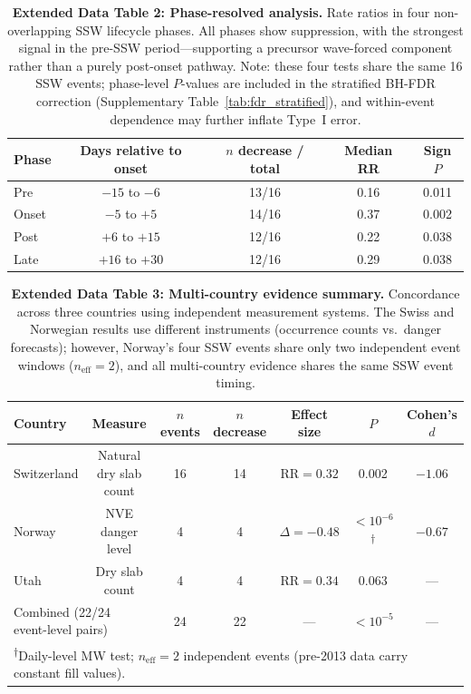 \documentclass[11pt,letterpaper]{article}
\begin{document}
\begin{table}[!ht]
\centering
\caption{\textbf{Extended Data Table 2: Phase-resolved analysis.}
Rate ratios in four non-overlapping SSW lifecycle phases. All phases show suppression, with the strongest signal in the pre-SSW period---supporting a precursor wave-forced component rather than a purely post-onset pathway. Note: these four tests share the same 16 SSW events; phase-level $P$-values are included in the stratified BH-FDR correction (Supplementary Table~\ref{tab:fdr_stratified}), and within-event dependence may further inflate Type~I error.}
\label{tab:phases}
\small
\begin{tabular}{lcccc}
\toprule
Phase & Days relative to onset & $n$ decrease / total & Median RR & Sign $P$ \\
\midrule
Pre & $-15$ to $-6$ & 13/16 & 0.16 & 0.011 \\
Onset & $-5$ to $+5$ & 14/16 & 0.37 & 0.002 \\
Post & $+6$ to $+15$ & 12/16 & 0.22 & 0.038 \\
Late & $+16$ to $+30$ & 12/16 & 0.29 & 0.038 \\
\bottomrule
\end{tabular}
\end{table}

\begin{table}[!ht]
\centering
\caption{\textbf{Extended Data Table 3: Multi-country evidence summary.}
Concordance across three countries using independent measurement systems. The Swiss and Norwegian results use different instruments (occurrence counts vs.\ danger forecasts); however, Norway's four SSW events share only two independent event windows ($n_{\mathrm{eff}} = 2$), and all multi-country evidence shares the same SSW event timing.}
\label{tab:multi}
\small
\begin{tabular}{lcccccc}
\toprule
Country & Measure & $n$ events & $n$ decrease & Effect size & $P$ & Cohen's $d$ \\
\midrule
Switzerland & Natural dry slab count & 16 & 14 & $\mathrm{RR} = 0.32$ & 0.002 & $-1.06$ \\
Norway & NVE danger level & 4 & 4 & $\Delta = -0.48$ & $< 10^{-6}$\textsuperscript{$\dagger$} & $-0.67$ \\
Utah & Dry slab count & 4 & 4 & $\mathrm{RR} = 0.34$ & 0.063 & --- \\
\midrule
\multicolumn{2}{l}{Combined (22/24 event-level pairs)} & 24 & 22 & --- & $< 10^{-5}$ & --- \\
\bottomrule
\multicolumn{7}{l}{\textsuperscript{$\dagger$}\scriptsize Daily-level MW test; $n_{\mathrm{eff}} = 2$ independent events (pre-2013 data carry constant fill values).}
\end{tabular}
\end{table}
\end{document}
